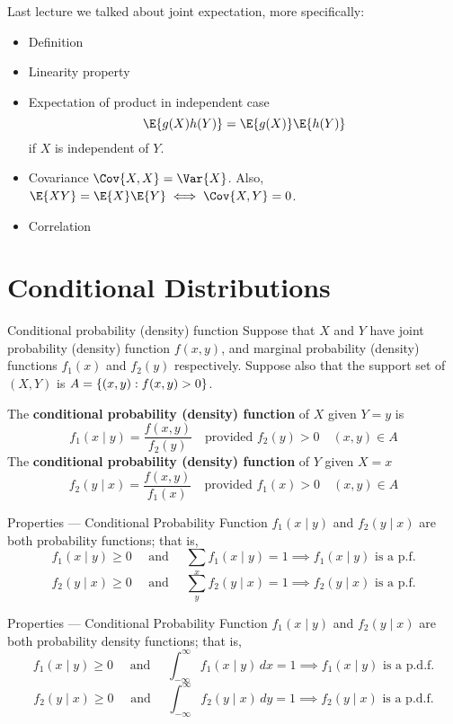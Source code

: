Last lecture we talked about joint expectation, more specifically:
\begin{itemize}
    \item Definition
    \item Linearity property
    \item Expectation of product in independent case
          \[ \E{g(X)h(Y)}=\E{g(X)}\E{h(Y)} \]
          if $ X $ is independent of $ Y $.
    \item Covariance $ \Cov{X,X}=\Var{X} $. Also,
          $ \E{XY}=\E{X}\E{Y}\iff \Cov{X,Y}=0 $.
    \item Correlation
\end{itemize}
\section{Conditional Distributions}
\begin{Definition}{Conditional probability (density) function}{}
    Suppose that $ X $ and $ Y $ have joint probability
    (density) function $ f(x,y) $,
    and marginal probability (density) functions
    $ f_1(x) $ and $ f_2(y) $ respectively.
    Suppose also that the support set
    of $ (X,Y) $ is $ A=\{(x,y):f(x,y)>0\} $.

    The \textbf{conditional probability (density) function}
    of $ X $ given $ Y=y $ is
    \[ f_1(x\mid y)=\frac{f(x,y)}{f_2(y)}\quad\text{provided } f_2(y)>0\quad (x,y)\in A \]
    The \textbf{conditional probability (density) function} of $ Y $ given $ X=x $
    \[ f_2(y\mid x)=\frac{f(x,y)}{f_1(x)}\quad\text{provided } f_1(x)>0\quad (x,y)\in A \]
\end{Definition}
\begin{Proposition}{Properties --- Conditional Probability Function}{}
    $ f_1(x\mid y) $ and $ f_2(y\mid x) $ are both probability functions;
    that is,
    \[ f_1(x\mid y)\geqslant 0 \quad\text{ and }\quad
        \sum_{x}f_1(x\mid y)=1\implies f_1(x\mid y)\text{ is a p.f.}\]
    \[ f_2(y\mid x)\geqslant 0 \quad\text{ and }\quad
        \sum_{y}f_2(y\mid x)=1\implies f_2(y\mid x)\text{ is a p.f.}\]
\end{Proposition}
\begin{Proposition}{Properties --- Conditional Probability Function}{}
    $ f_1(x\mid y) $ and $ f_2(y\mid x) $ are both probability density functions;
    that is,
    \[ f_1(x\mid y)\geqslant 0 \quad\text{ and }\quad
        \int_{-\infty}^{\infty} f_1(x\mid y)\, d{x} =1\implies f_1(x\mid y)\text{ is a p.d.f.}\]
    \[ f_2(y\mid x)\geqslant 0 \quad\text{ and }\quad
        \int_{-\infty}^{\infty} f_2(y\mid x)\, d{y}=1\implies f_2(y\mid x)\text{ is a p.d.f.}\]
\end{Proposition}

